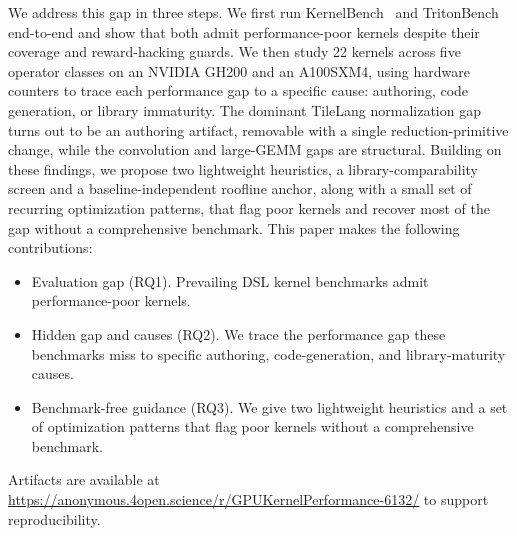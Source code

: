 We address this gap in three steps. We first run KernelBench~\cite{kernelbench} and TritonBench~\cite{li2025tritonbench} end-to-end and show that both admit performance-poor kernels despite their coverage and reward-hacking guards. We then study 22 kernels across five operator classes on an NVIDIA GH200 and an A100SXM4, using hardware counters to trace each performance gap to a specific cause: authoring, code generation, or library immaturity. The dominant TileLang normalization gap turns out to be an authoring artifact, removable with a single reduction-primitive change, while the convolution and large-GEMM gaps are structural. Building on these findings, we propose two lightweight heuristics, a library-comparability screen and a baseline-independent roofline anchor, along with a small set of recurring optimization patterns, that flag poor kernels and recover most of the gap without a comprehensive benchmark. This paper makes the following contributions:

\begin{itemize}
  \item {Evaluation gap (RQ1).} Prevailing DSL kernel benchmarks admit performance-poor kernels.
  \item {Hidden gap and causes (RQ2).} We trace the performance gap these benchmarks miss to specific authoring, code-generation, and library-maturity causes.
  \item {Benchmark-free guidance (RQ3).} We give two lightweight heuristics and a set of optimization patterns that flag poor kernels without a comprehensive benchmark.

\end{itemize}
\noindent Artifacts  are available at \url{https://anonymous.4open.science/r/GPUKernelPerformance-6132/} to support reproducibility.